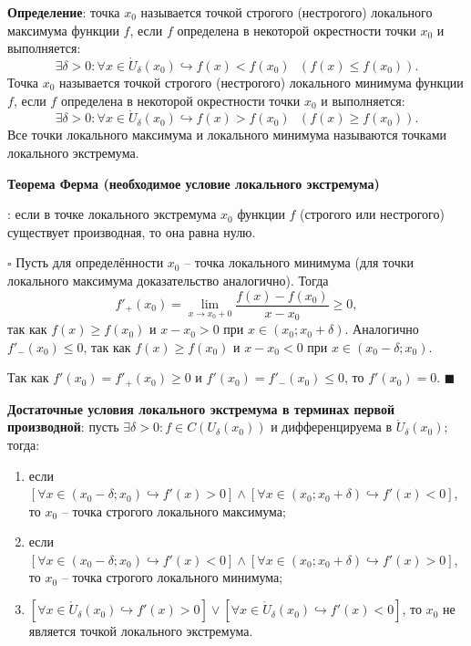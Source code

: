 \documentclass[12pt, a4paper, reqno]{article}
\begin{document}
    \textbf{Определение}: точка $x_0$ называется точкой строгого (нестрогого) локального максимума
    функции $f$, если $f$ определена в некоторой окрестности точки $x_0$ и выполняется:
    \begin{equation*}
        \exists\delta > 0: \forall x\in \mathring U_{\delta}(x_0)\hookrightarrow f(x) < f(x_0)\ \ \
        (f(x) \leq f(x_0)).
    \end{equation*}
    Точка $x_0$ называется точкой строгого (нестрогого) локального минимума функции $f$, если $f$
    определена в некоторой окрестности точки $x_0$ и выполняется:
    \begin{equation*}
        \exists\delta > 0: \forall x\in \mathring U_{\delta}(x_0)\hookrightarrow f(x) > f(x_0)\ \ \
        (f(x) \geq f(x_0)).
    \end{equation*}
    Все точки локального максимума и локального минимума называются точками локального экстремума.

    \hypertarget{fermat}{\textbf{Теорема Ферма (необходимое условие локального экстремума)}}: если в точке
    локального экстремума $x_0$ функции $f$ (строгого или нестрогого) существует производная, то она
    равна нулю.

    $\square$ Пусть для определённости $x_0$ -- точка локального минимума (для точки локального
    максимума доказательство аналогично). Тогда
    \begin{equation*}
        f'_{+}(x_0) = \lim\limits_{x\to x_0 + 0} \dfrac{f(x) - f(x_0)}{x - x_0} \geq 0,
    \end{equation*}
    так как $f(x) \geq f(x_0)$ и $x - x_0 > 0$ при $x\in(x_0; x_0 + \delta)$. Аналогично
    $f'_{-}(x_0) \leq 0$, так как $f(x) \geq f(x_0)$ и $x - x_0 < 0$ при $x\in(x_0 - \delta; x_0)$.

    Так как $f'(x_0) = f'_{+}(x_0) \geq 0$  и $f'(x_0) = f'_{-}(x_0) \leq 0$, то $f'(x_0) = 0$.
    $\blacksquare$

    \textbf{Достаточные условия локального экстремума в терминах первой производной}: пусть
    $\exists\delta > 0: f \in C(U_{\delta}(x_0))$ и дифференцируема в $\mathring U_{\delta}(x_0)$;
    тогда:
    \begin{enumerate}
        \item если $[\forall x\in(x_0 - \delta; x_0)\hookrightarrow f'(x) > 0] \wedge
              [\forall x\in(x_0; x_0 + \delta)\hookrightarrow f'(x) < 0]$, то $x_0$ -- точка
              строгого локального максимума;
        \item если $[\forall x\in(x_0 - \delta; x_0)\hookrightarrow f'(x) < 0] \wedge
              [\forall x\in(x_0; x_0 + \delta)\hookrightarrow f'(x) > 0]$, то $x_0$ -- точка
              строгого локального минимума;
        \item $[\forall x\in\mathring U_{\delta}(x_0)\hookrightarrow f'(x) > 0] \vee
               [\forall x\in\mathring U_{\delta}(x_0)\hookrightarrow f'(x) < 0]$, то $x_0$ не является
              точкой локального экстремума.
    \end{enumerate}
\end{document}
